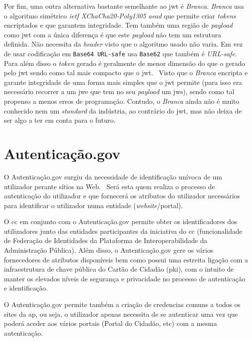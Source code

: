 Por fim, uma outra alternativa bastante semelhante ao \acrshort{jwt} é \textit{Branca}. \textit{Branca} usa o algoritmo simétrico \textit{\acrshort{ietf} XChaCha20-Poly1305 \acrshort{aead}} que permite criar \textit{tokens} encriptados e que garantem integridade. Tem também uma região de \textit{payload} como \acrshort{jwt} com a única diferença é que este \textit{payload} não tem um estrutura definida. Não necessita da \textit{header} visto que o algoritmo usado não varia. Em vez de usar codificação em \texttt{Base64 URL-safe} usa \texttt{Base62} que também é \textit{URL-safe}. Para além disso o \textit{token} gerado é geralmente de menor dimensão do que o gerado pelo \acrshort{jwt} sendo como tal mais compacto que o \acrshort{jwt}.~\cite{branca} Visto que o \textit{Branca} encripta e garante integridade de uma forma mais simples que o \acrshort{jwt} permite (para isso era necessário recorrer a um \acrshort{jwe} que tem no seu \textit{payload} um \acrshort{jws}), sendo como tal propenso a menos erros de programação. Contudo, o \textit{Branca} ainda não é muito conhecido nem um \textit{standard} da indústria, ao contrário do \acrshort{jwt}, mas não deixa de ser algo a ter em conta para o futuro. 

\section{Autenticação.gov}
O Autenticação.gov surgiu da necessidade de identificação unívoca de um utilizador perante sítios na Web.~\cite{agov} Será esta quem realiza o processo de autenticação do utilizador e que fornecerá os atributos do utilizador necessários para identificar o utilizador numa entidade (\textit{website}/portal).

O \acrshort{cc} em conjunto com o Autenticação.gov permite obter os identificadores dos utilizadores junto das entidades participantes da iniciativa do \acrshort{cc} (funcionalidade de Federação de Identidades da Plataforma de Interoperabilidade da Administração Pública). Além disso, o Autenticação.gov gere os vários fornecedores de atributos disponíveis bem como possui uma estreita ligação com a infraestrutura de chave pública do Cartão de Cidadão (\acrfull{pki}), com o intuito de manter os elevados níveis de segurança e privacidade no processo de autenticação e identificação.~\cite{agov}

O Autenticação.gov permite também a criação de credencias comuns a todos os sites da \acrshort{ap}, ou seja, o utilizador apenas necessita de se autenticar uma vez que poderá aceder aos vários portais (Portal do Cidadão, etc) com a mesma autenticação.

